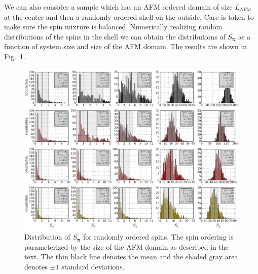 \documentclass[11pt,letter]{article}
\newcommand{\bv}[1]{\ensuremath{\bm{#1}}}
\begin{document}
We can also consider a sample which has an AFM ordered domain of size
$L_{\text{AFM}}$ at the center and then a randomly ordered shell on the
outside.  Care is taken to make sure the spin mixture is balanced.  Numerically
realizing random distributions of the spins in the shell we can obtain the
distributions of $S_{\bv{\pi}}$ as a function of system size and size of the
AFM domain.  The results are shown in Fig.~\ref{fig:crystal-size}. 
\begin{figure}
\centering \includegraphics[width=\textwidth]{figures_140308/Noise_hist.png}
\caption[Fluctuations in $S_{\bv{\pi}}$]{\small Distribution of $S_{\bv{\pi}}$
for randomly ordered spins.  The spin ordering is parameterized by the size of
the AFM domain as described in the text.  The thin black line denotes the mean
and the shaded gray area denotes $\pm1$ standard deviations.  }
\label{fig:crystal-size}
\end{figure}
\end{document}
